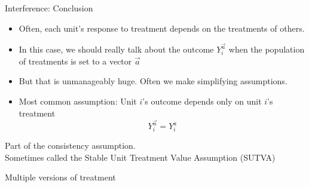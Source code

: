 \documentclass{beamer}
\begin{document}

\begin{frame}{Interference: Conclusion}

\begin{itemize}[<+->]
\item Often, each unit's response to treatment depends on the treatments of others.
\item In this case, we should really talk about the outcome $Y_i^{\vec{a}}$ when the population of treatments is set to a vector $\vec{a}$
\item But that is unmanageably huge. Often we make simplifying assumptions.
\item Most common assumption: Unit $i$'s outcome depends only on unit $i$'s treatment $$Y_i^{\vec{a}} = Y_i^a$$
\end{itemize} \pause
Part of the consistency assumption.\\Sometimes called the Stable Unit Treatment Value Assumption (SUTVA)

\end{frame}

\begin{frame}
\huge Multiple versions of treatment
\end{frame}
\end{document}
